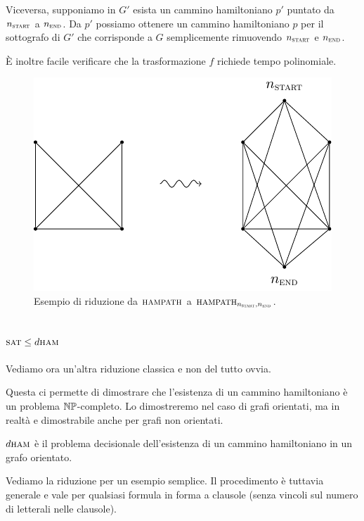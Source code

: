 Viceversa, supponiamo in $G'$ esista un cammino hamiltoniano $p'$ puntato da $n_{\textsc{start}}$ a
$n_{\textsc{end}}$. Da $p'$ possiamo ottenere un cammino hamiltoniano $p$ per il sottografo di $G'$
che corrisponde a $G$ semplicemente rimuovendo $n_{\textsc{start}}$ e $n_{\textsc{end}}$.

È inoltre facile verificare che la trasformazione $f$ richiede tempo polinomiale.

\begin{figure}[h]
    \begin{center}
        \includegraphics{./img/NPClass/HAM2PHAM.pdf}
        \caption{Esempio di riduzione da $\textsc{hampath}$ a
        $\textsc{hampath}_{n_{\textsc{start}},n_{\textsc{end}}}$.}
    \end{center}
\end{figure}

\subsection{$\textsc{sat} \leq d\textsc{ham}$}

Vediamo ora un'altra riduzione classica e non del tutto ovvia.

Questa ci permette di dimostrare che l'esistenza di un cammino hamiltoniano è un problema
$\mathbb{NP}$-completo. Lo dimostreremo nel caso di grafi orientati, ma in realtà e dimostrabile anche
per grafi non orientati.

$d\textsc{ham}$ è il problema decisionale dell'esistenza di un cammino hamiltoniano in un grafo orientato.

Vediamo la riduzione per un esempio semplice. Il procedimento è tuttavia generale e vale per
qualsiasi formula in forma a clausole (senza vincoli sul numero di letterali nelle clausole).

